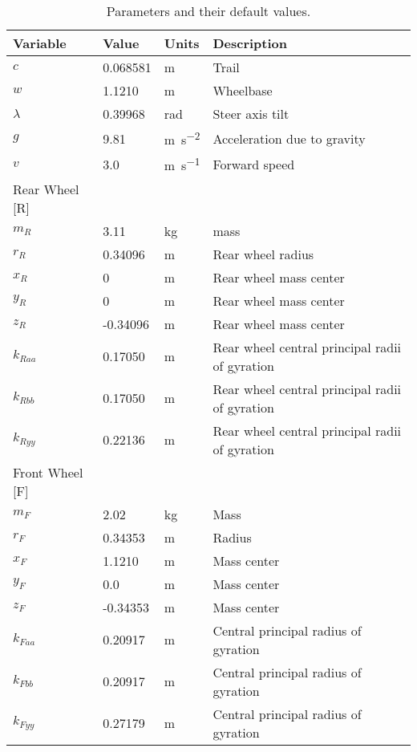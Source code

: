 \documentclass{bmd2019a}
\begin{document}
\begin{table}
  \caption{Parameters and their default values.}
  \begin{tabular}{llll}
    \toprule
    Variable & Value & Units & Description \\
    \midrule
    $c$ &  0.068581 & \si{\meter} & Trail \\
    $w$ &  1.1210 & \si{\meter} & Wheelbase \\
    $\lambda$ &  0.39968 & \si{\radian} & Steer axis tilt \\
    $g$ &  9.81 & \si{\meter\per\second\squared} & Acceleration due to gravity \\
    $v$ &  3.0 & \si{\meter\per\second} & Forward speed \\
    Rear Wheel [R] & & \\
    \midrule
    $m_R$ &  3.11 & \si{\kilogram} & mass \\
    $r_R$ &  0.34096 & \si{\meter} & Rear wheel radius \\
    $x_R$ & 0 & \si{\meter} & Rear wheel mass center \\
    $y_R$ & 0 & \si{\meter} & Rear wheel mass center \\
    $z_R$ & -0.34096 & \si{\meter} & Rear wheel mass center \\
    $k_{Raa}$ &  0.17050 & \si{\meter} & Rear wheel central principal radii of gyration \\
    $k_{Rbb}$ &  0.17050 & \si{\meter} & Rear wheel central principal radii of gyration  \\
    $k_{Ryy}$ &  0.22136 & \si{\meter} & Rear wheel central principal radii of gyration \\
    Front Wheel [F] & & \\
    \midrule
    $m_F$ &  2.02 & \si{\kilogram} & Mass \\
    $r_F$ &  0.34353 & \si{\meter} & Radius \\
    $x_F$ &  1.1210 & \si{\meter} & Mass center \\
    $y_F$ & 0.0 & \si{\meter} & Mass center \\
    $z_F$ & -0.34353 & \si{\meter} & Mass center \\
    $k_{Faa}$ &  0.20917 & \si{\meter} & Central principal radius of gyration \\
    $k_{Fbb}$ &  0.20917 & \si{\meter} & Central principal radius of gyration \\
    $k_{Fyy}$ &  0.27179 & \si{\meter} & Central principal radius of gyration \\

\end{tabular}
\end{table}
\end{document}
